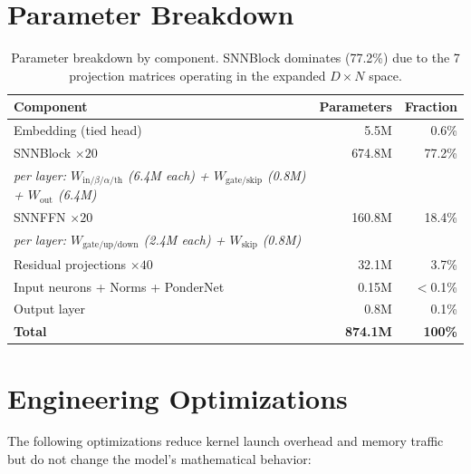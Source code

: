 \documentclass[10pt,twocolumn]{article}
\begin{document}
\section{Parameter Breakdown}
\label{app:params}

\begin{table}[H]
\centering
\caption{Parameter breakdown by component.
SNNBlock dominates (77.2\%) due to the 7 projection matrices operating in the expanded $D \times N$ space.}
\begin{tabular}{lrr}
\toprule
\textbf{Component} & \textbf{Parameters} & \textbf{Fraction} \\
\midrule
Embedding (tied head) & 5.5M & 0.6\% \\
SNNBlock $\times 20$ & 674.8M & 77.2\% \\
\quad \emph{per layer: $W_{\text{in/}\beta/\alpha/\text{th}}$ (6.4M each) + $W_{\text{gate/skip}}$ (0.8M) + $W_{\text{out}}$ (6.4M)} & & \\
SNNFFN $\times 20$ & 160.8M & 18.4\% \\
\quad \emph{per layer: $W_{\text{gate/up/down}}$ (2.4M each) + $W_{\text{skip}}$ (0.8M)} & & \\
Residual projections $\times 40$ & 32.1M & 3.7\% \\
Input neurons + Norms + PonderNet & 0.15M & $<$0.1\% \\
Output layer & 0.8M & 0.1\% \\
\midrule
\textbf{Total} & \textbf{874.1M} & \textbf{100\%} \\
\bottomrule
\end{tabular}
\end{table}

\section{Engineering Optimizations}
\label{app:engineering}

The following optimizations reduce kernel launch overhead and memory traffic but do not change the model's mathematical behavior:
\end{document}
